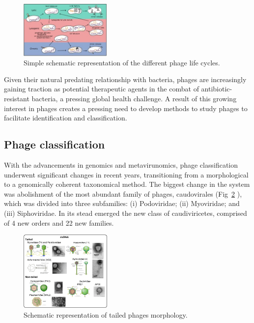 \documentclass[runningheads]{llncs}
\begin{document}
\begin{figure}
\begin{center}
\includegraphics[width=0.4\textwidth]{./figures/fig1-lifecycle.jpg}
\caption{Simple schematic representation of the different phage life cycles. \cite{varona2017}} \label{fig1}
\end{center}
\end{figure}

Given their natural predating relationship with bacteria, phages are increasingly gaining traction as potential therapeutic agents in the combat of antibiotic-resistant bacteria, a pressing global health challenge.\cite{ioannou2023,haq2012,gamachu2022,sulakvelidze2001}
%
%
A result of this growing interest in phages creates a pressing need to develop methods to study phages to facilitate identification and classification. 

\subsection{Phage classification}
With the advancements in genomics and metavirunomics, phage classification underwent significant changes in recent years, transitioning from a morphological to a genomically coherent taxonomical method. The biggest change in the system was abolishment of the most abundant family of phages, caudovirales (Fig~\ref{fig2} \cite{dion2020}), which was divided into three subfamilies: (i) Podoviridae; (ii) Myoviridae; and (iii) Siphoviridae. In its stead emerged the new class of caudiviricetes, comprised of 4 new orders and 22 new families. \cite{dion2020,turner2021,turner2023,ackermann2007}   
%
%
\begin{figure}
\begin{center}
\includegraphics[width=0.4\textwidth]{./figures/fig2-tailed-morpho.png}
\caption{Schematic representation of tailed phages morphology. \cite{dion2020}} \label{fig2}
\end{center}
\end{figure}
\end{document}
